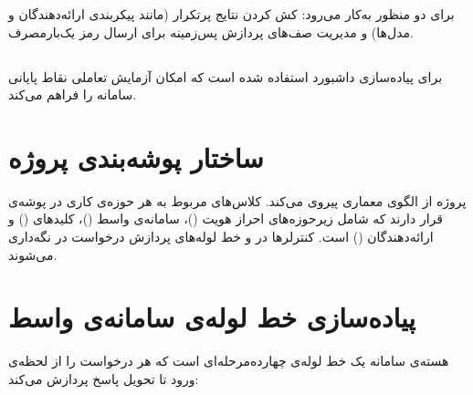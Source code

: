  برای دو منظور به‌کار می‌رود: کش کردن نتایج پرتکرار (مانند
پیکربندی ارائه‌دهندگان و مدل‌ها) و مدیریت صف‌های پردازش پس‌زمینه برای
ارسال رمز یک‌بارمصرف.

\subsection{}

 برای پیاده‌سازی داشبورد  استفاده شده است که
امکان آزمایش تعاملی نقاط پایانی سامانه را فراهم می‌کند.

\section{ساختار پوشه‌بندی پروژه}

پروژه از الگوی معماری  پیروی می‌کند.
کلاس‌های مربوط به هر حوزه‌ی کاری در پوشه‌ی  قرار دارند
که شامل زیرحوزه‌های احراز هویت ()، سامانه‌ی واسط ()،
کلیدهای  () و ارائه‌دهندگان () است.
کنترلرها در  و خط لوله‌های پردازش درخواست
در  نگه‌داری می‌شوند.

\section{پیاده‌سازی خط لوله‌ی سامانه‌ی واسط}
\label{sec:pipeline-impl}

هسته‌ی سامانه یک خط لوله‌ی چهارده‌مرحله‌ای است که هر درخواست  را
از لحظه‌ی ورود تا تحویل پاسخ پردازش می‌کند:

